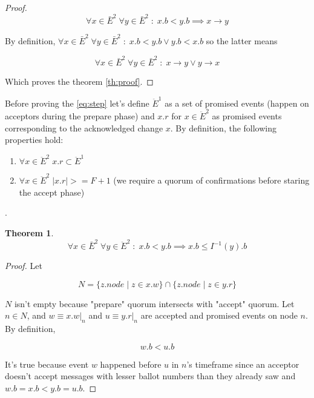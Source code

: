\documentclass[12pt]{article}
\newtheorem{theorem}{Theorem}
\theoremstyle{definition}
\begin{document}
\begin{appendices}
\begin{proof}
  \begin{equation}
    \forall x \in \bar{E}^2 \; \forall y \in \bar{E}^2 \;:\; x.b < y.b \implies x \to y
  \end{equation}

  By definition, $\forall x \in \bar{E}^2 \; \forall y \in \bar{E}^2 \;:\; x.b < y.b \lor y.b < x.b$ so the latter means

  \begin{equation}
    \forall x \in \bar{E}^2 \; \forall y \in \bar{E}^2 \;:\; x \to y \lor y \to x
  \end{equation}

  Which proves the theorem \ref{th:proof}.
\end{proof}

Before proving the \ref{eq:step} let's define $\ddot{E}^1$ as a set of promised events (happen on acceptors during the prepare phase) and $x.r$ for $x \in \ddot{E}^2$ as promised events corresponding to the acknowledged change $x$. By definition, the following properties hold:
\begin{enumerate}
  \item $\forall x \in \ddot{E}^2 \; x.r \subset \ddot{E}^1$
  \item $\forall x \in \ddot{E}^2 \; |x.r| >= F+1$ (we require a quorum of confirmations before staring the accept phase)
\end{enumerate}.

\begin{theorem} \label{th:proof2}
  $$\forall x \in \bar{E}^2 \; \forall y \in \ddot{E}^2 \;:\; x.b < y.b \implies x.b \leq I^{-1}(y).b$$
\end{theorem}

\begin{proof}
  Let
  
  $$N = \{z.node \;|\; z \in x.w\} \cap \{z.node \;|\; z \in y.r\}$$

  $N$ isn't empty because "prepare" quorum intersects with "accept" quorum. Let $n \in N$, and $w \equiv x.w |_n$ and $u \equiv y.r |_n$ are accepted and promised events on node $n$. By definition,

  \begin{equation}
    w.b < u.b
  \end{equation}
  
  It's true because event $w$ happened before $u$ in $n$'s timeframe since an acceptor doesn't accept messages with lesser ballot numbers than they already saw and $w.b = x.b < y.b = u.b$.


\end{proof}
\end{appendices}
\end{document}
